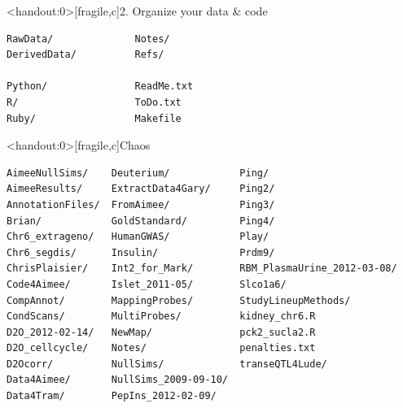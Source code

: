 \documentclass[12pt,t]{beamer}
\begin{document}
\begin{frame}<handout:0>[fragile,c]{2. Organize your data \& code}


\begin{center}
\begin{minipage}[c]{10.3cm}
\begin{semiverbatim}
\lstset{basicstyle=\normalsize}
\begin{lstlisting}[linewidth=10.3cm]
RawData/              Notes/
DerivedData/          Refs/

Python/               ReadMe.txt
R/                    ToDo.txt
Ruby/                 Makefile
\end{lstlisting}
\end{semiverbatim}
\end{minipage}
\end{center}

\end{frame}


\begin{frame}<handout:0>[fragile,c]{Chaos}

\addtocounter{framenumber}{-1}

\begin{center}
\begin{minipage}[c]{11.33cm}
\begin{semiverbatim}
\lstset{basicstyle=\scriptsize}
\begin{lstlisting}[linewidth=11.33cm]
AimeeNullSims/    Deuterium/            Ping/
AimeeResults/     ExtractData4Gary/     Ping2/
AnnotationFiles/  FromAimee/            Ping3/
Brian/            GoldStandard/         Ping4/
Chr6_extrageno/   HumanGWAS/            Play/
Chr6_segdis/      Insulin/              Prdm9/
ChrisPlaisier/    Int2_for_Mark/        RBM_PlasmaUrine_2012-03-08/
Code4Aimee/       Islet_2011-05/        Slco1a6/
CompAnnot/        MappingProbes/        StudyLineupMethods/
CondScans/        MultiProbes/          kidney_chr6.R
D2O_2012-02-14/   NewMap/               pck2_sucla2.R
D2O_cellcycle/    Notes/                penalties.txt
D2Ocorr/          NullSims/             transeQTL4Lude/
Data4Aimee/       NullSims_2009-09-10/
Data4Tram/        PepIns_2012-02-09/
\end{lstlisting}
\end{semiverbatim}
\end{minipage}
\end{center}

\end{frame}
\end{document}
